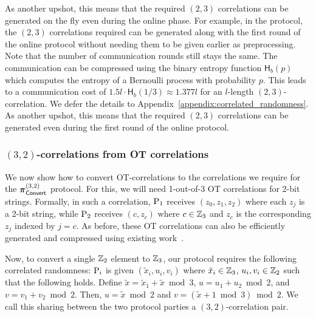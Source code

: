 As another upshot, this means that the required $(2,3)$ correlations can be generated on the fly even during the online phase. For example, in the \ttwPRF protocol, the $(2,3)$ correlations required can be generated along with the first round of the online protocol without needing them to be given earlier as preprocessing. Note that the number of communication rounds still stays the same.
\else
The communication can be compressed using the binary entropy function $\textsf{H}_b(p)$ which computes the entropy of a Bernoulli process with probability $p$. This leads to a communication cost of $1.5l \cdot \textsf{H}_b(1/3) \approx 1.377l$ for an $l$-length $(2,3)$-correlation. We defer the details to Appendix~\ref{appendix:correlated_randomness}. As another upshot, this means that the required $(2,3)$ correlations can be generated even during the first round of the online protocol.
\fi
\subsubsection{$(3,2)$-correlations from OT correlations}

We now show how to convert OT-correlations to the correlations we require for the $\boldsymbol{\pi}_{\textnormal{\textsf{Convert}}}^{(3,2)}$ protocol. For this, we will need 1-out-of-3 OT correlations for 2-bit strings. Formally, in such a correlation, $\textnormal{P}_1$ receives $(z_0, z_1, z_2)$ where each $z_j$ is a 2-bit string, while $\textnormal{P}_2$ receives $(c, z_c)$ where $c \in \mathbb{Z}_3$ and $z_c$ is the corresponding $z_j$ indexed by $j = c$. As before, these OT correlations can also be efficiently generated and compressed using existing work~\cite{boyle2019-pcg,yang2020-ferret}.

Now, to convert a single $\mathbb{Z}_2$ element to $\mathbb{Z}_3$, our protocol requires the following correlated randomness: $\textnormal{P}_i$ is given $(\tilde{x}_i, u_i, v_i)$ where $\tilde{x}_i \in \mathbb{Z}_3$, $u_i,v_i \in \mathbb{Z}_2$ such that the following holds. Define $\tilde{x} = \tilde{x}_1 + \tilde{x} \bmod 3$, $u = u_1 + u_2 \bmod 2$, and $v = v_1 + v_2 \bmod 2$. Then, $u = \tilde{x} \bmod 2$ and $v = (\tilde{x} + 1 \bmod 3) \bmod 2$. We call this sharing between the two protocol parties a $(3,2)$-correlation pair.

